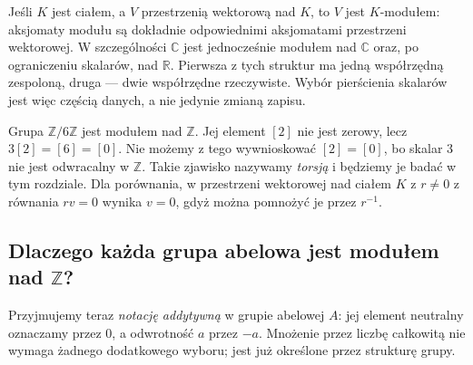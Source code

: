 \begin{przyklad}
Jeśli $K$ jest ciałem, a $V$ przestrzenią wektorową nad $K$,
to $V$ jest $K$-modułem: aksjomaty modułu są dokładnie
odpowiednimi aksjomatami przestrzeni wektorowej.
W szczególności $\mathbb C$ jest jednocześnie modułem nad
$\mathbb C$ oraz, po ograniczeniu skalarów, nad $\mathbb R$.
Pierwsza z tych struktur ma jedną współrzędną zespoloną,
druga --- dwie współrzędne rzeczywiste.
Wybór pierścienia skalarów jest więc częścią danych, a nie
jedynie zmianą zapisu.
\end{przyklad}

\begin{przyklad}
Grupa $\mathbb Z/6\mathbb Z$ jest modułem nad $\mathbb Z$.
Jej element $[2]$ nie jest zerowy, lecz
$3[2]=[6]=[0]$. Nie możemy z tego wywnioskować
$[2]=[0]$, bo skalar $3$ nie jest odwracalny w $\mathbb Z$.
Takie zjawisko nazywamy \emph{torsją} i będziemy je badać
w tym rozdziale. Dla porównania, w przestrzeni wektorowej
nad ciałem $K$ z $r\ne0$ z równania $rv=0$ wynika $v=0$,
gdyż można pomnożyć je przez $r^{-1}$.
\end{przyklad}

\subsection[Dlaczego grupa abelowa jest modułem nad liczbami całkowitymi?]{Dlaczego każda grupa abelowa jest modułem nad $\mathbb Z$?}
Przyjmujemy teraz \emph{notację addytywną} w grupie abelowej $A$:
jej element neutralny oznaczamy przez $0$, a odwrotność $a$
przez $-a$. Mnożenie przez liczbę całkowitą nie wymaga
żadnego dodatkowego wyboru; jest już określone przez
strukturę grupy.

